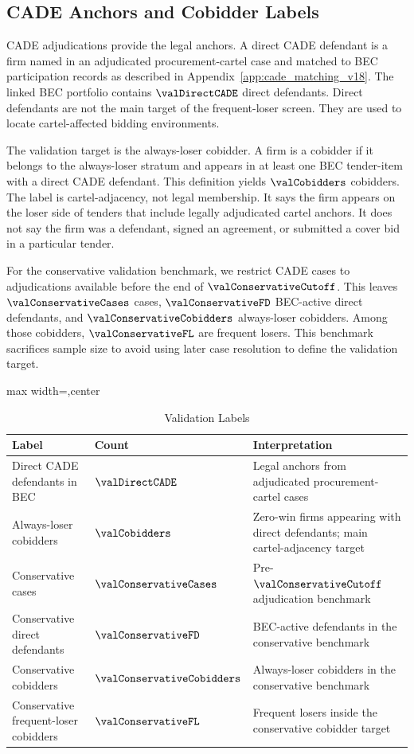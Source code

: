 \subsection{CADE Anchors and Cobidder Labels}
\label{app:cade_labels_v18}

CADE adjudications provide the legal anchors. A direct CADE
defendant is a firm named in an adjudicated procurement-cartel
case and matched to BEC participation records as described in
Appendix~\ref{app:cade_matching_v18}. The linked BEC portfolio
contains $\valDirectCADE$ direct defendants. Direct
defendants are not the main target of the frequent-loser screen.
They are used to locate cartel-affected bidding environments.

The validation target is the always-loser cobidder. A firm is a
cobidder if it belongs to the always-loser stratum and appears in
at least one BEC tender-item with a direct CADE defendant. This
definition yields $\valCobidders$ cobidders. The label is
cartel-adjacency, not legal membership. It says the firm appears
on the loser side of tenders that include legally adjudicated
cartel anchors. It does not say the firm was a defendant, signed
an agreement, or submitted a cover bid in a particular tender.

For the conservative validation benchmark, we restrict CADE cases
to adjudications available before the end of
$\valConservativeCutoff$. This leaves $\valConservativeCases$
cases, $\valConservativeFD$ BEC-active direct defendants, and
$\valConservativeCobidders$ always-loser cobidders. Among those
cobidders, $\valConservativeFL$ are frequent losers. This
benchmark sacrifices sample size to avoid using later case
resolution to define the validation target.

\begin{table}[htbp]
\centering
\caption{Validation Labels}
\label{tab:validation_labels_app_v18}
\footnotesize
\begin{adjustbox}{max width=\textwidth,center}
\begin{tabular}{p{4.0cm}p{2.6cm}p{7.0cm}}
\toprule
Label & Count & Interpretation \\
\midrule
Direct CADE defendants in BEC & $\valDirectCADE$ & Legal anchors from adjudicated procurement-cartel cases \\
Always-loser cobidders & $\valCobidders$ & Zero-win firms appearing with direct defendants; main cartel-adjacency target \\
Conservative cases & $\valConservativeCases$ & Pre-$\valConservativeCutoff$ adjudication benchmark \\
Conservative direct defendants & $\valConservativeFD$ & BEC-active defendants in the conservative benchmark \\
Conservative cobidders & $\valConservativeCobidders$ & Always-loser cobidders in the conservative benchmark \\
Conservative frequent-loser cobidders & $\valConservativeFL$ & Frequent losers inside the conservative cobidder target \\
\bottomrule
\end{tabular}
\end{adjustbox}
\end{table}

